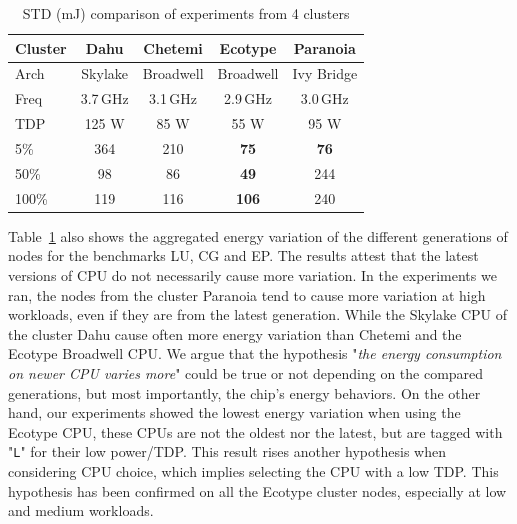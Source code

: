\begin{table}
    \centering
    \caption{STD (mJ) comparison of experiments from 4 clusters}
    \small
    \begin{tabular}{|l|c|c|c|c|}
        \hline
        \textbf{Cluster} & \textbf{Dahu} & \textbf{Chetemi} & \textbf{Ecotype} & \textbf{Paranoia} \\
        \hline
        \hline
        Arch             & Skylake       & Broadwell        & Broadwell        & Ivy Bridge        \\
        \hline
        Freq             & 3.7\,GHz      & 3.1\,GHz         & 2.9\,GHz         & 3.0\,GHz          \\
        \hline
        TDP              & 125 W         & 85 W             & 55 W             & 95 W              \\
        \hline
        \hline
        5\%              & 364           & 210              & \textbf{75}      & \textbf{76}       \\
        \hline
        50\%             & 98            & 86               & \textbf{49}      & 244               \\
        \hline
        100\%            & 119           & 116              & \textbf{106}     & 240               \\
        \hline
    \end{tabular}
    \label{table:cpus}
\end{table}

Table~\ref{table:cpus} also shows the aggregated energy variation of the different generations of nodes for the benchmarks \textsf{LU}, \textsf{CG} and \textsf{EP}.
The results attest that the latest versions of CPU do not necessarily cause more variation.
In the experiments we ran, the nodes from the cluster \textsf{Paranoia} tend to cause more variation at high workloads, even if they are from the latest generation.
While the Skylake CPU of the cluster \textsf{Dahu} cause often more energy variation than \textsf{Chetemi} and the Ecotype Broadwell CPU.
We argue that the hypothesis "\emph{the energy consumption on newer CPU varies more}" could be true or not depending on the compared generations, but most importantly, the chip's energy behaviors.
On the other hand, our experiments showed the lowest energy variation when using the \textsf{Ecotype CPU}, these CPUs are not the oldest nor the latest, but are tagged with "\texttt{L}" for their low power/TDP.
This result rises another hypothesis when considering CPU choice, which implies selecting the CPU with a low TDP.
This hypothesis has been confirmed on all the \textsf{Ecotype} cluster nodes, especially at low and medium workloads.

